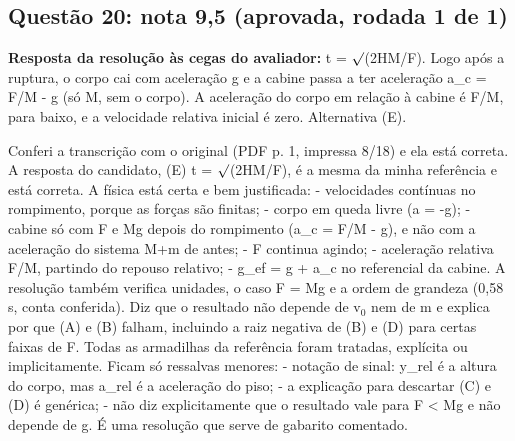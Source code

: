 \documentclass{article}%
\begin{document}
\subsection*{Questão 20: nota 9,5 (aprovada, rodada 1 de 1)}%
\textbf{Resposta da resolução às cegas do avaliador:} t = $\surd$(2HM/F). Logo após a ruptura, o corpo cai com aceleração g e a cabine passa a ter aceleração a\_c = F/M - g (só M, sem o corpo). A aceleração do corpo em relação à cabine é F/M, para baixo, e a velocidade relativa inicial é zero. Alternativa (E).\par %
Conferi a transcrição com o original (PDF p. 1, impressa 8/18) e ela está correta. A resposta do candidato, (E) t = $\surd$(2HM/F), é a mesma da minha referência e está correta.\newline%
\newline%
A física está certa e bem justificada:\newline%
{-} velocidades contínuas no rompimento, porque as forças são finitas;\newline%
{-} corpo em queda livre (a = -g);\newline%
{-} cabine só com F e Mg depois do rompimento (a\_c = F/M - g), e não com a aceleração do sistema M+m de antes;\newline%
{-} F continua agindo;\newline%
{-} aceleração relativa F/M, partindo do repouso relativo;\newline%
{-} g\_ef = g + a\_c no referencial da cabine.\newline%
\newline%
A resolução também verifica unidades, o caso F = Mg e a ordem de grandeza (0,58 s, conta conferida). Diz que o resultado não depende de v$_{0}$ nem de m e explica por que (A) e (B) falham, incluindo a raiz negativa de (B) e (D) para certas faixas de F.\newline%
\newline%
Todas as armadilhas da referência foram tratadas, explícita ou implicitamente. Ficam só ressalvas menores:\newline%
{-} notação de sinal: y\_rel é a altura do corpo, mas a\_rel é a aceleração do piso;\newline%
{-} a explicação para descartar (C) e (D) é genérica;\newline%
{-} não diz explicitamente que o resultado vale para F < Mg e não depende de g.\newline%
\newline%
É uma resolução que serve de gabarito comentado.%
\end{document}
